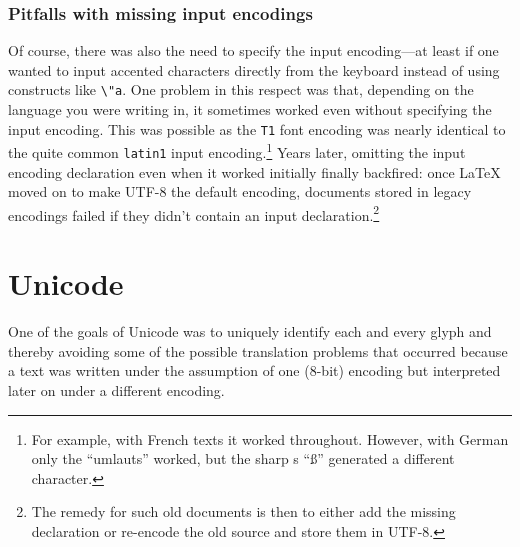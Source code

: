 \documentclass{ltugboat}
\begin{document}
\subsubsection{Pitfalls with missing input encodings}

Of course, there was also the need to specify the input encoding---at
least if one wanted to input accented characters directly from the
keyboard instead of using constructs like \verb=\"a=. One problem in
this respect was that, depending on the language you were writing in,
it sometimes worked even without specifying the input encoding. This
was possible as the \texttt{T1} font encoding was nearly identical to
the quite common \texttt{latin1} input encoding.\footnote{For example,
  with French texts it worked throughout. However, with German only
  the ``umlauts'' worked, but the sharp s ``ß'' generated a different
  character.}  Years later, omitting the input encoding declaration
even when it worked initially finally backfired: once \LaTeX{} moved
on to make UTF-8 the default encoding, documents stored in legacy
encodings failed if they didn't contain an input
declaration.\footnote{The remedy for such old documents is then to
  either add the missing declaration or re-encode the old source and
  store them in UTF-8.}


\section{Unicode}

One of the goals of Unicode was to uniquely identify each and every
glyph and thereby avoiding some of the possible translation problems
that occurred because a text was written under the assumption of one
(8-bit) encoding but interpreted later on under a different encoding.

\vfill

\makesignature
\end{document}
